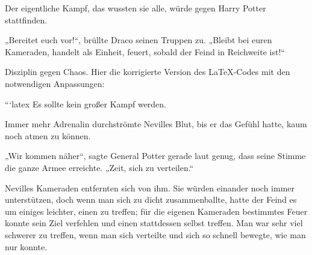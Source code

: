 Der eigentliche Kampf, das wussten sie alle, würde gegen Harry Potter stattfinden.

„Bereitet euch vor!“, brüllte Draco seinen Truppen zu.
„Bleibt bei euren Kameraden, handelt als Einheit, feuert, sobald der Feind in Reichweite ist!“

Disziplin gegen Chaos.
Hier die korrigierte Version des LaTeX-Codes mit den notwendigen Anpassungen:

```latex
Es sollte kein großer Kampf werden.

\later

Immer mehr Adrenalin durchströmte Nevilles Blut, bis er das Gefühl hatte, kaum noch atmen zu können.

„Wir kommen näher“, sagte General Potter gerade laut genug, dass seine Stimme die ganze Armee erreichte.
„Zeit, sich zu verteilen.“

Nevilles Kameraden entfernten sich von ihm. Sie würden einander noch immer unterstützen, doch wenn man sich zu dicht zusammenballte, hatte der Feind es um einiges leichter, einen zu treffen; für die eigenen Kameraden bestimmtes Feuer konnte sein Ziel verfehlen und einen stattdessen selbst treffen. Man war sehr viel schwerer zu treffen, wenn man sich verteilte und sich so schnell bewegte, wie man nur konnte.

